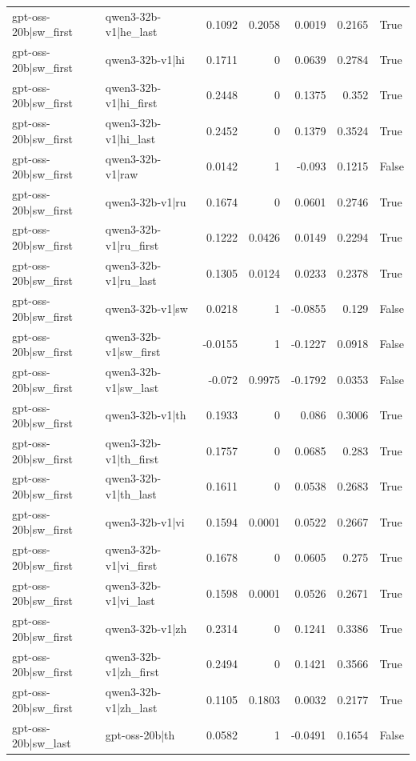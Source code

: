 \begin{table}
\begin{tabular}{l l r r r r l}
gpt-oss-20b|sw_first & qwen3-32b-v1|he_last & 0.1092 & 0.2058 & 0.0019 & 0.2165 & True \\
gpt-oss-20b|sw_first & qwen3-32b-v1|hi & 0.1711 & 0 & 0.0639 & 0.2784 & True \\
gpt-oss-20b|sw_first & qwen3-32b-v1|hi_first & 0.2448 & 0 & 0.1375 & 0.352 & True \\
gpt-oss-20b|sw_first & qwen3-32b-v1|hi_last & 0.2452 & 0 & 0.1379 & 0.3524 & True \\
gpt-oss-20b|sw_first & qwen3-32b-v1|raw & 0.0142 & 1 & -0.093 & 0.1215 & False \\
gpt-oss-20b|sw_first & qwen3-32b-v1|ru & 0.1674 & 0 & 0.0601 & 0.2746 & True \\
gpt-oss-20b|sw_first & qwen3-32b-v1|ru_first & 0.1222 & 0.0426 & 0.0149 & 0.2294 & True \\
gpt-oss-20b|sw_first & qwen3-32b-v1|ru_last & 0.1305 & 0.0124 & 0.0233 & 0.2378 & True \\
gpt-oss-20b|sw_first & qwen3-32b-v1|sw & 0.0218 & 1 & -0.0855 & 0.129 & False \\
gpt-oss-20b|sw_first & qwen3-32b-v1|sw_first & -0.0155 & 1 & -0.1227 & 0.0918 & False \\
gpt-oss-20b|sw_first & qwen3-32b-v1|sw_last & -0.072 & 0.9975 & -0.1792 & 0.0353 & False \\
gpt-oss-20b|sw_first & qwen3-32b-v1|th & 0.1933 & 0 & 0.086 & 0.3006 & True \\
gpt-oss-20b|sw_first & qwen3-32b-v1|th_first & 0.1757 & 0 & 0.0685 & 0.283 & True \\
gpt-oss-20b|sw_first & qwen3-32b-v1|th_last & 0.1611 & 0 & 0.0538 & 0.2683 & True \\
gpt-oss-20b|sw_first & qwen3-32b-v1|vi & 0.1594 & 0.0001 & 0.0522 & 0.2667 & True \\
gpt-oss-20b|sw_first & qwen3-32b-v1|vi_first & 0.1678 & 0 & 0.0605 & 0.275 & True \\
gpt-oss-20b|sw_first & qwen3-32b-v1|vi_last & 0.1598 & 0.0001 & 0.0526 & 0.2671 & True \\
gpt-oss-20b|sw_first & qwen3-32b-v1|zh & 0.2314 & 0 & 0.1241 & 0.3386 & True \\
gpt-oss-20b|sw_first & qwen3-32b-v1|zh_first & 0.2494 & 0 & 0.1421 & 0.3566 & True \\
gpt-oss-20b|sw_first & qwen3-32b-v1|zh_last & 0.1105 & 0.1803 & 0.0032 & 0.2177 & True \\
gpt-oss-20b|sw_last & gpt-oss-20b|th & 0.0582 & 1 & -0.0491 & 0.1654 & False \\

\end{tabular}
\end{table}
